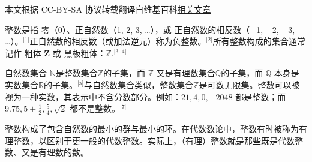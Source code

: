
本文根据 CC-BY-SA 协议转载翻译自维基百科\href{https://en.wikipedia.org/wiki/Integer}{相关文章}

整数是指 零（0）、正自然数（1, 2, 3, …），或 正自然数的相反数（−1, −2, −3, …）。\(^\text{[1]}\)正自然数的相反数（或加法逆元）称为负整数。\(^\text{[2]}\)所有整数构成的集合通常记作 粗体 \(\mathbf{Z}\) 或 黑板粗体：$\mathbb{Z}$.\(^\text{[3][4]}\)  

自然数集合  $\mathbb{N}$是整数集合$\mathbb{Z}$的子集，而 $\mathbb{Z}$ 又是有理数集合$\mathbb{Q}$的子集，而 $\mathbb{Q}$ 本身是实数集合$\mathbb{R}$的子集。\(^\text{[a]}\)与自然数集合类似，整数集合$\mathbb{Z}$是可数无限集。整数可以被视为一种实数，其表示中不含分数部分。例如：$21, 4, 0, -2048$ 都是整数；而 $9.75, 5+\tfrac{1}{2}, \tfrac{5}{4}, \sqrt{2}$ 都不是整数。\(^\text{[7]}\)

整数构成了包含自然数的最小的群与最小的环。在代数数论中，整数有时被称为有理整数，以区别于更一般的代数整数。实际上，（有理）整数就是那些既是代数整数、又是有理数的数。
